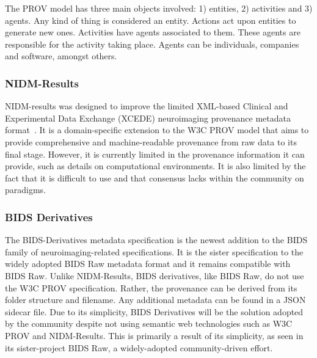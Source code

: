             The PROV model has three main objects involved: 1) entities, 2)
            activities and 3) agents. Any kind of thing is considered an entity.
            Actions act upon entities to generate new ones. Activities have
            agents associated to them. These agents are responsible for the
            activity taking place. Agents can be individuals, companies and
            software, amongst others.
            
            \subsubsection{NIDM-Results}
                NIDM-results was designed to improve the limited XML-based
                Clinical and Experimental Data Exchange (XCEDE) neuroimaging
                provenance metadata format~\cite{Maumet:2016aa}. It is a
                domain-specific extension to the W3C PROV model that aims to
                provide comprehensive and machine-readable provenance from raw
                data to its final stage.
                However, it is currently limited in the provenance information
                it can provide, such as details on computational environments.
                It is also limited by the fact that it is difficult to use and
                that consensus lacks within the community on paradigms.

            \subsubsection{BIDS Derivatives}
                The BIDS-Derivatives metadata specification is the newest
                addition to the BIDS family of neuroimaging-related
                specifications. It is the sister specification to the widely
                adopted BIDS Raw metadata format and it remains compatible with
                BIDS Raw. Unlike NIDM-Results, BIDS derivatives, like BIDS Raw,
                do not use the W3C PROV specification. Rather, the provenance
                can be derived from its folder structure and filename. Any
                additional metadata can be found in a JSON sidecar file. Due to
                its simplicity, BIDS Derivatives will be the solution adopted by
                the community despite not using semantic web technologies such
                as W3C PROV and NIDM-Results. This is primarily a result of its
                simplicity, as seen in its sister-project BIDS Raw, a
                widely-adopted community-driven effort.
            
